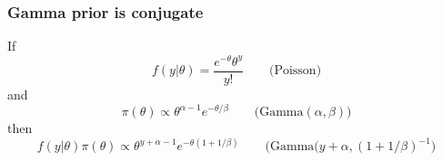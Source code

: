 \documentclass{beamer}
\newcommand{\E}{\mathbb{E}}
\newcommand{\V}{\mathbb{V}}
\newcommand{\1}{\ensuremath{\mathbf{1}}}
\begin{document}
%
%
%
\begin{frame}\frametitle{Gamma prior is conjugate}
	If
	\begin{equation}
		f(y|\theta) = \frac{e^{-\theta}\theta^y}{y!} \qquad \text{(Poisson)}
	\end{equation}
	and
	\begin{equation}
		\pi(\theta) \propto \theta^{\alpha-1}e^{-\theta/\beta} \qquad \text{(Gamma$(\alpha,\beta)$)}
	\end{equation}
	then
	\begin{equation}
		f(y|\theta) \pi(\theta) \propto \theta^{y+\alpha-1}e^{-\theta(1+1/\beta)} \qquad \text{(Gamma$(y+\alpha,(1+1/\beta)^{-1}$)}
	\end{equation}
\end{frame}
%
%
%
\end{document}
